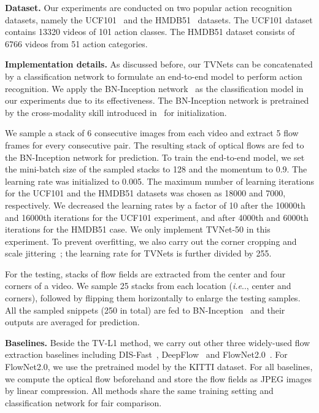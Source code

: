 \documentclass[10pt,twocolumn,letterpaper]{article}
\makeatletter
\DeclareRobustCommand\onedot{\futurelet\@let@token\@onedot}
\def\@onedot{\ifx\@let@token.\else.\null\fi\xspace}
\def\ie{\emph{i.e}\onedot} \def\Ie{\emph{I.e}\onedot}
\makeatother
\begin{document}
\textbf{Dataset.}
Our experiments are conducted on two popular action recognition datasets, namely the {UCF101}~\cite{soomro2012ucf101} and
the {HMDB51}~\cite{kuehne2011hmdb} datasets.  The {UCF101} dataset contains 13320 videos of 101 action classes. The {HMDB51} dataset consists of 6766 videos from 51 action categories.


\textbf{Implementation details.}
As discussed before, our TVNets can be concatenated by a classification network to formulate an end-to-end model to perform action recognition. We apply the BN-Inception network~\cite{Wang_ECCV16} as the classification model in our experiments due to its effectiveness. The BN-Inception network is pretrained by the cross-modality skill introduced in~\cite{wang2015towards} for initialization.

We sample a stack of 6 consecutive images from each video and extract 5 flow frames for every consecutive pair. The resulting stack of optical flows are fed to the BN-Inception network for prediction. To train the end-to-end model, we set the mini-batch size of the sampled stacks to 128 and the momentum to 0.9.
The learning rate was initialized to 0.005. The maximum number of learning iterations for the {UCF101} and the {HMDB51}
datasets was chosen as 18000 and 7000, respectively. We decreased the learning rates by a factor of 10 after
the 10000th and 16000th iterations for the {UCF101} experiment, and after 4000th and 6000th iterations for the {HMDB51} case. We only implement TVNet-50 in this experiment. To prevent overfitting, we also carry out the corner cropping and scale jittering~\cite{Wang_ECCV16}; the learning rate for TVNets is further divided by 255.

For the testing, stacks of flow fields are extracted from the center and four corners of a video. We sample 25 stacks from each location (\ie, center and corners), followed by flipping them horizontally to enlarge the testing samples. All the sampled snippets (250 in total) are fed to BN-Inception~\cite{Wang_ECCV16} and their outputs are averaged for prediction.

\textbf{Baselines.}
Beside the TV-L1 method, we carry out other three widely-used flow extraction baselines including DIS-Fast~\cite{kroeger2016fast}, DeepFlow~\cite{weinzaepfel2013deepflow} and FlowNet2.0~\cite{ilg2016flownet}. For FlowNet2.0, we use the pretrained model by the KITTI dataset.  For all baselines, we compute the optical flow beforehand and store the flow fields as JPEG images by linear compression. All methods share the same training setting and classification network for fair comparison.
\end{document}
